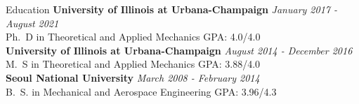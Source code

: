 \documentclass{resume} %
\begin{document}

\begin{rSection}{Education}
{\bf University of Illinois at Urbana-Champaign} \hfill {\em January 2017 - August 2021}
\\ Ph.\ D in Theoretical and Applied Mechanics \hfill {GPA: 4.0/4.0}\\
{\bf University of Illinois at Urbana-Champaign} \hfill {\em August 2014 - December 2016}
\\ M.\ S in Theoretical and Applied Mechanics \hfill {GPA: 3.88/4.0}\\
{\bf Seoul National University} \hfill {\em March 2008 - February 2014}
\\ B.\ S. in Mechanical and Aerospace Engineering \hfill {GPA: 3.96/4.3}
\end{rSection}



\end{document}
